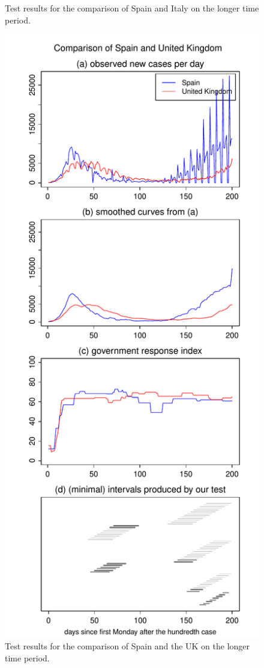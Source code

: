 \documentclass[a4paper,12pt]{article}
\numberwithin{equation}{section}
\begin{document}
{\begin{figure}[p!]
\begin{minipage}[t]{0.49\textwidth}
\caption{Test results for the comparison of Spain and Italy on the longer time period.}
\end{minipage}
\hspace{0.25cm}
\begin{minipage}[t]{0.49\textwidth}
\includegraphics[width=\textwidth]{plots/ESP_vs_GBR_long}
\caption{Test results for the comparison of Spain and the UK on the longer time period.}
\end{minipage}
\end{figure}


}
\end{document}

